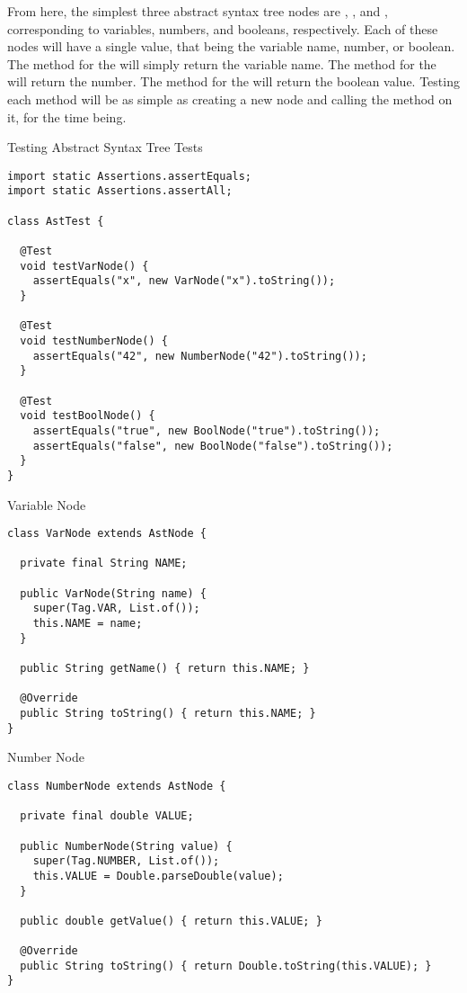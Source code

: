 From here, the simplest three abstract syntax tree nodes are , , and , corresponding to variables, numbers, and booleans, respectively. Each of these nodes will have a single value, that being the variable name, number, or boolean. The  method for the  will simply return the variable name. The  method for the  will return the number. The  method for the  will return the boolean value. Testing each method will be as simple as creating a new node and calling the  method on it, for the time being.

\begin{cl}{Testing Abstract Syntax Tree Tests}
\begin{lstlisting}[language=MyJava]
import static Assertions.assertEquals;
import static Assertions.assertAll;

class AstTest {

  @Test
  void testVarNode() {
    assertEquals("x", new VarNode("x").toString());
  }

  @Test
  void testNumberNode() {
    assertEquals("42", new NumberNode("42").toString());
  }

  @Test
  void testBoolNode() {
    assertEquals("true", new BoolNode("true").toString());
    assertEquals("false", new BoolNode("false").toString());
  }  
}
\end{lstlisting}
\end{cl}

\begin{cl}{Variable Node}
\begin{lstlisting}[language=MyJava]
class VarNode extends AstNode {

  private final String NAME;

  public VarNode(String name) {
    super(Tag.VAR, List.of());
    this.NAME = name;
  }

  public String getName() { return this.NAME; }

  @Override
  public String toString() { return this.NAME; }
}
\end{lstlisting}
\end{cl}

\begin{cl}{Number Node}
\begin{lstlisting}[language=MyJava]
class NumberNode extends AstNode {

  private final double VALUE;

  public NumberNode(String value) {
    super(Tag.NUMBER, List.of());
    this.VALUE = Double.parseDouble(value);
  }

  public double getValue() { return this.VALUE; }

  @Override
  public String toString() { return Double.toString(this.VALUE); }
}
\end{lstlisting}
\end{cl}

